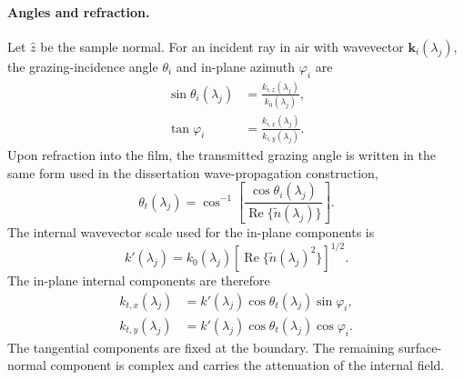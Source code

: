 \documentclass[11pt]{article}
\begin{document}
\paragraph{Angles and refraction.}
Let $\hat{z}$ be the sample normal. For an incident ray in air with wavevector
$\mathbf{k}_i(\lambda_j)$, the grazing-incidence angle $\theta_i$ and in-plane azimuth $\varphi_i$ are
\begin{align}
  \sin\theta_i(\lambda_j) &= \frac{k_{i,z}(\lambda_j)}{k_0(\lambda_j)},\\
  \tan\varphi_i &= \frac{k_{i,x}(\lambda_j)}{k_{i,y}(\lambda_j)}.
  \label{eq:si_incident_angles_lambda}
\end{align}
Upon refraction into the film, the transmitted grazing angle is written in the same form used in the
dissertation wave-propagation construction,
\begin{equation}
  \theta_t(\lambda_j)
  =
  \cos^{-1}\!\left[
  \frac{\cos\theta_i(\lambda_j)}{\operatorname{Re}\{\tilde{n}(\lambda_j)\}}
  \right].
  \label{eq:si_theta_t_lambda}
\end{equation}
The internal wavevector scale used for the in-plane components is
\begin{equation}
  k'(\lambda_j)
  =
  k_0(\lambda_j)
  \left[\operatorname{Re}\{\tilde{n}(\lambda_j)^2\}\right]^{1/2}.
  \label{eq:si_kprime_lambda}
\end{equation}
The in-plane internal components are therefore
\begin{align}
  k_{t,x}(\lambda_j)
  &= k'(\lambda_j)\cos\theta_t(\lambda_j)\sin\varphi_i,\\
  k_{t,y}(\lambda_j)
  &= k'(\lambda_j)\cos\theta_t(\lambda_j)\cos\varphi_i.
  \label{eq:si_ktxy_lambda}
\end{align}
The tangential components are fixed at the boundary. The remaining surface-normal component is
complex and carries the attenuation of the internal field.
\end{document}

